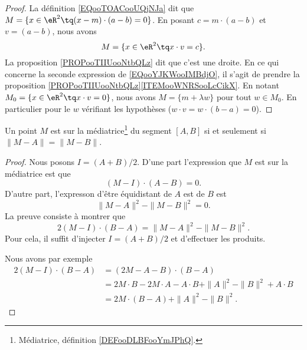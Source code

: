 \begin{proof}
	La définition \eqref{EQooTOACooUQjNJa} dit que \( M=\{ x\in \eR^2\tq (x-m)\cdot (a-b)=0 \}\). En posant \( c=m\cdot (a-b)\) et \( v=(a-b)\), nous avons
	\begin{equation}
		M=\{ x\in \eR^2\tq x\cdot v=c \}.
	\end{equation}
	La proposition \ref{PROPooTIIUooNtbQLz} dit que c'est une droite. En ce qui concerne la seconde expression de \eqref{EQooYJKWooIMBdjO}, il s'agit de prendre la proposition \ref{PROPooTIIUooNtbQLz}\ref{ITEMooWNRSooLcCikX}. En notant \( M_0=\{ x\in\eR^2\tq x\cdot v=0 \}\), nous avons \( M=\{ m+\lambda w \}\) pour tout \( w\in M_0\). En particulier pour le \( w\) vérifiant les hypothèses (\( w\cdot v=w\cdot(b-a)=0\)).
\end{proof}


\begin{lemma}   \label{LEMooSZZWooPDHnGl}
	Un point \( M\) est sur la médiatrice\footnote{Médiatrice, définition \ref{DEFooDLBFooYmJPhQ}.} du segment \( [A,B]\) si et seulement si \( \| M-A \|=\| M-B \|\).
\end{lemma}

\begin{proof}
	Nous posons \( I=(A+B)/2\). D'une part l'expression que \( M\) est sur la médiatrice est que
	\begin{equation}
		(M-I)\cdot (A-B)=0.
	\end{equation}
	D'autre part, l'expresson d'être équidistant de \( A\) est de \( B\) est
	\begin{equation}
		\| M-A \|^2-\| M-B \|^2=0.
	\end{equation}
	La preuve consiste à montrer que
	\begin{equation}
		2(M-I)\cdot (B-A)=\| M-A \|^2-\| M-B \|^2.
	\end{equation}
	Pour cela, il suffit d'injecter \( I=(A+B)/2\) et d'effectuer les produits.

	Nous avons par exemple
	\begin{subequations}
		\begin{align}
			2(M-I)\cdot (B-A) & =(2M-A-B)\cdot(B-A)                                        \\
			                  & =2M\cdot B-2M\cdot A-A\cdot B+\| A \|^2-\| B \|^2+A\cdot B \\
			                  & =2M\cdot (B-A)+\| A \|^2-\| B \|^2.
		\end{align}
	\end{subequations}
\end{proof}

